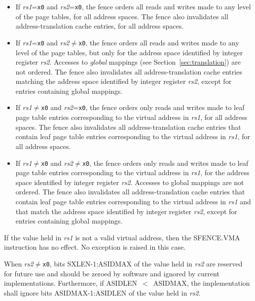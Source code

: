 \begin{itemize}
\item If {\em rs1}={\tt x0} and {\em rs2}={\tt x0}, the fence orders all
      reads and writes made to any level of the page tables, for all
      address spaces.  The fence also invalidates all address-translation
      cache entries, for all address spaces.
\item If {\em rs1}={\tt x0} and {\em rs2}$\neq${\tt x0}, the fence orders
      all reads and writes made to any level of the page tables, but only
      for the address space identified by integer register {\em rs2}.
      Accesses to {\em global} mappings (see Section~\ref{sec:translation})
      are not ordered.  The fence also invalidates all address-translation
      cache entries matching the address space identified by integer register
      {\em rs2}, except for entries containing global mappings.
\item If {\em rs1}$\neq${\tt x0} and {\em rs2}={\tt x0}, the fence orders
      only reads and writes made to leaf page table entries corresponding
      to the virtual address in {\em rs1}, for all address spaces.
      The fence also invalidates all address-translation cache entries that
      contain leaf page table entries corresponding to the virtual address
      in {\em rs1}, for all address spaces.
\item If {\em rs1}$\neq${\tt x0} and {\em rs2}$\neq${\tt x0}, the fence
      orders only reads and writes made to leaf page table entries
      corresponding to the virtual address in {\em rs1}, for the address
      space identified by integer register {\em rs2}.
      Accesses to global mappings are not ordered.  The fence also
      invalidates all address-translation cache entries that contain leaf
      page table entries corresponding to the virtual address in {\em rs1}
      and that match the address space identified by integer register {\em
      rs2}, except for entries containing global mappings.
\end{itemize}

If the value held in {\em rs1} is not a valid virtual address, then the
SFENCE.VMA instruction has no effect.  No exception is raised in this case.

When {\em rs2}$\neq${\tt x0}, bits SXLEN-1:ASIDMAX of the value held in {\em
rs2} are reserved for future use and should be zeroed by software and ignored
by current implementations.  Furthermore, if ASIDLEN~$<$~ASIDMAX, the
implementation shall ignore bits ASIDMAX-1:ASIDLEN of the value held in {\em
rs2}.

